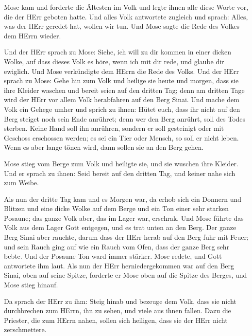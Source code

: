  Mose kam und forderte die Ältesten im Volk und legte ihnen
alle diese Worte vor, die der HErr geboten hatte.  Und alles
Volk antwortete zugleich und sprach: Alles, was der HErr geredet hat,
wollen wir tun. Und Mose sagte die Rede des Volkes dem HErrn wieder.

 Und der HErr sprach zu Mose: Siehe, ich will zu dir kommen
in einer dicken Wolke, auf dass dieses Volk es höre, wenn ich mit dir
rede, und glaube dir ewiglich. Und Mose verkündigte dem HErrn die Rede
des Volks.  Und der HErr sprach zu Mose: Gehe hin zum Volk
und heilige sie heute und morgen, dass sie ihre Kleider waschen
 und bereit seien auf den dritten Tag; denn am dritten Tage
wird der HErr vor allem Volk herabfahren auf den Berg Sinai.
 Und mache dem Volk ein Gehege umher und sprich zu ihnen:
Hütet euch, dass ihr nicht auf den Berg steiget noch sein Ende anrühret;
denn wer den Berg anrührt, soll des Todes sterben.  Keine
Hand soll ihn anrühren, sondern er soll gesteinigt oder mit Geschoss
erschossen werden; es sei ein Tier oder Mensch, so soll er nicht leben.
Wenn es aber lange tönen wird, dann sollen sie an den Berg gehen.

 Mose stieg vom Berge zum Volk und heiligte sie, und sie
wuschen ihre Kleider.  Und er sprach zu ihnen: Seid bereit
auf den dritten Tag, und keiner nahe sich zum Weibe.

 Als nun der dritte Tag kam und es Morgen war, da erhob
sich ein Donnern und Blitzen und eine dicke Wolke auf dem Berge und ein
Ton einer sehr starken Posaune; das ganze Volk aber, das im Lager war,
erschrak.  Und Mose führte das Volk aus dem Lager Gott
entgegen, und es trat unten an den Berg.  Der ganze Berg
Sinai aber rauchte, darum dass der HErr herab auf den Berg fuhr mit
Feuer; und sein Rauch ging auf wie ein Rauch vom Ofen, dass der ganze
Berg sehr bebte.  Und der Posaune Ton ward immer stärker.
Mose redete, und Gott antwortete ihm laut.  Als nun der
HErr herniedergekommen war auf den Berg Sinai, oben auf seine Spitze,
forderte er Mose oben auf die Spitze des Berges, und Mose stieg hinauf.

 Da sprach der HErr zu ihm: Steig hinab und bezeuge dem
Volk, dass sie nicht durchbrechen zum HErrn, ihn zu sehen, und viele aus
ihnen fallen.  Dazu die Priester, die zum HErrn nahen,
sollen sich heiligen, dass sie der HErr nicht zerschmettere.

